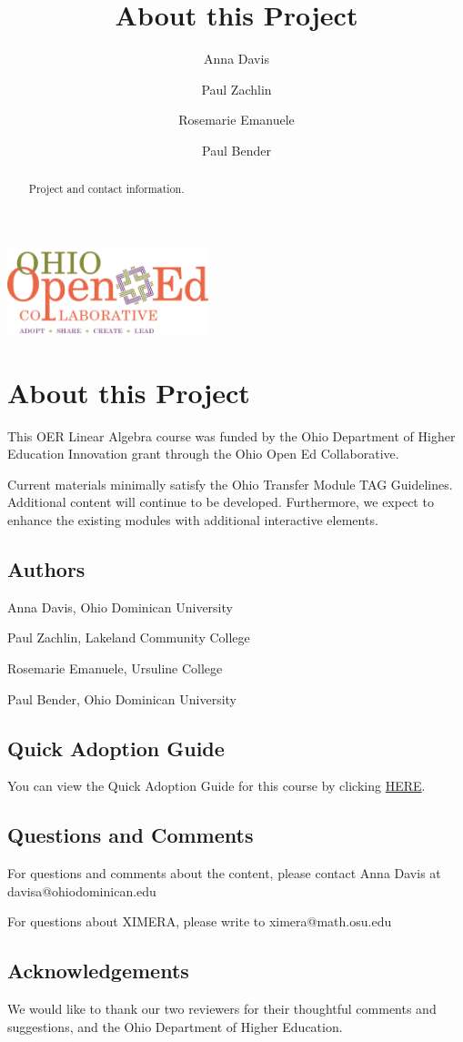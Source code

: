 \documentclass{ximera}
\author{Anna Davis \and Paul Zachlin \and Rosemarie Emanuele \and Paul Bender} \title{About this Project} \license{CC-BY 4.0}
\begin{document}
\begin{abstract}
 Project and contact information.
\end{abstract}
\maketitle

\begin{image}
\includegraphics[height=1in]{ooec.jpg}
\end{image}

\section{About this Project}
This OER Linear Algebra course was funded by the Ohio Department of Higher Education Innovation grant through the Ohio Open Ed Collaborative. 

Current materials minimally satisfy the Ohio Transfer Module TAG Guidelines.  Additional content will continue to be developed.  Furthermore, we expect to enhance the existing modules with additional interactive elements.

\subsection{Authors}
Anna Davis, Ohio Dominican University

Paul Zachlin, Lakeland Community College

Rosemarie Emanuele, Ursuline College

Paul Bender, Ohio Dominican University

\subsection{Quick Adoption Guide}
You can view the Quick Adoption Guide for this course by clicking
\href{https://docs.google.com/document/d/1QdDMhCfn3Q_Cul5uVVYBDCgdzx6ndBxLnyagGVkz9gM/edit?usp=sharing}{HERE}.

\subsection{Questions and Comments}
For questions and comments about the content, please contact Anna Davis at davisa@ohiodominican.edu

For questions about XIMERA, please write to ximera@math.osu.edu

\subsection{Acknowledgements}
We would like to thank our two reviewers for their thoughtful comments and suggestions, and the Ohio Department of Higher Education.
\end{document}

